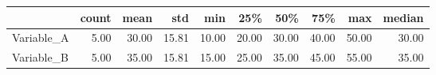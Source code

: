 \begin{tabular}{lrrrrrrrrr}
\hline
            &   count &   mean &   std &   min &   25\% &   50\% &   75\% &   max &   median \\
\hline
 Variable\_A &    5.00 &  30.00 & 15.81 & 10.00 & 20.00 & 30.00 & 40.00 & 50.00 &    30.00 \\
 Variable\_B &    5.00 &  35.00 & 15.81 & 15.00 & 25.00 & 35.00 & 45.00 & 55.00 &    35.00 \\
\hline
\end{tabular}